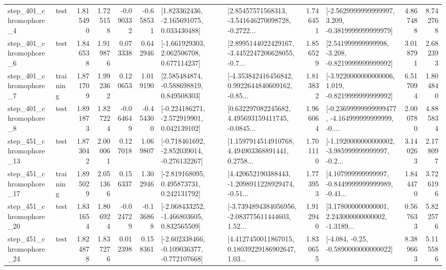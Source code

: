 \begin{tabular}{llrrrrllrlrr}
   step\_401\_chromophore\_4 &      test &      1.815490 &    1.725158 &     -0.090332 & -0.658531 &    [1.823362436, -2.165691075, 0.033430488] &  [2.85457571568313, -3.541646270098728, -0.2722... &       1.746451 &  [-2.5629999999999997, 3.209, -0.3819999999999979] &            4.867488 &          8.742768 \\
   step\_401\_chromophore\_6 &      test &      1.846538 &    1.919876 &      0.073338 &  0.642946 &    [-1.661929303, 2.062506708, 0.677114237] &  [2.8995144022429167, -3.4452247206628055, -0.7... &       1.856529 &   [2.541999999999998, -3.208, -0.8219999999999992] &            3.018791 &          2.682393 \\
   step\_401\_chromophore\_7 &  training &      1.871709 &    1.992362 &      0.120653 &  1.019190 &    [2.585484874, -0.588698819, 0.849508303] &  [-4.353842416456842, 0.9922644840609162, -0.85... &       1.813832 &  [-3.9220000000000006, 1.019, -0.8219999999999992] &            6.517094 &          1.804840 \\
   step\_401\_chromophore\_8 &      test &      1.891873 &    1.827224 &     -0.064649 & -0.454300 &   [-0.224186271, -2.572919901, 0.042139102] &  [0.632297082245682, 4.495693159411745, -0.0845... &       1.966064 &  [-0.23699999999999477, -4.164999999999999, -0.... &            2.000780 &          4.885834 \\
  step\_451\_chromophore\_13 &      test &      1.873042 &    2.000061 &      0.127018 &  1.069807 &  [-0.718461692, -2.852039014, -0.276132267] &  [1.1597914514910768, 4.494903368891441, 0.2758... &       1.701110 &  [-1.1920000000000002, -3.985999999999997, -0.2... &            3.140263 &          2.178097 \\
  step\_451\_chromophore\_17 &  training &      1.895029 &    2.051366 &      0.156337 &  1.302946 &    [-2.819168095, 0.495873731, 0.242131792] &  [4.420652190388443, -1.2098911228929474, -0.51... &       1.773953 &  [4.107999999999997, -0.8449999999999989, -0.41... &            1.844470 &          3.726196 \\
  step\_451\_chromophore\_20 &      test &      1.831654 &    1.806924 &     -0.024729 & -0.136868 &   [-2.068433252, -1.466803605, 0.832565509] &  [-3.7394894384056956, -2.083775611444603, 1.52... &       1.912940 &  [3.178000000000001, 2.243000000000002, -1.3189... &            0.567633 &          5.822576 \\
  step\_451\_chromophore\_24 &      test &      1.824878 &    1.837276 &      0.012398 &  0.158361 &  [-2.602338466, -0.109036377, -0.772107668] &  [4.4127450011867015, 0.18039229186902647, 1.03... &       1.830655 &               [-4.084, -0.25, -0.5890000000000022] &            8.389663 &          5.115586 \\

\end{tabular}
